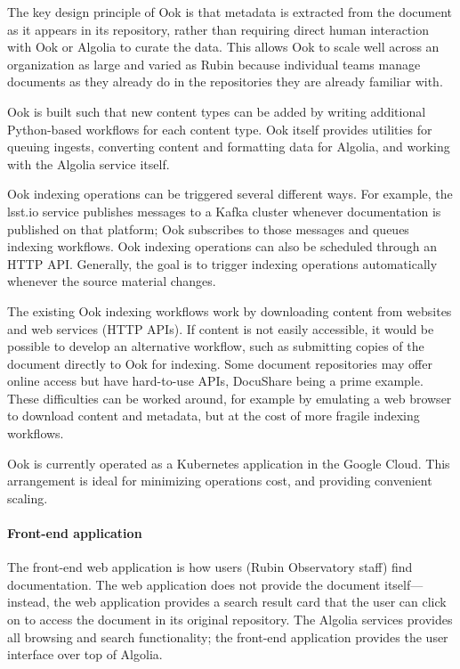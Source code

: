 The key design principle of Ook is that metadata is extracted from the document as it appears in its repository, rather than requiring direct human interaction with Ook or Algolia to curate the data.
This allows Ook to scale well across an organization as large and varied as Rubin because individual teams manage documents as they already do in the repositories they are already familiar with.

Ook is built such that new content types can be added by writing additional Python-based workflows for each content type.
Ook itself provides utilities for queuing ingests, converting content and formatting data for Algolia, and working with the Algolia service itself.

Ook indexing operations can be triggered several different ways.
For example, the lsst.io service publishes messages to a Kafka cluster whenever documentation is published on that platform; Ook subscribes to those messages and queues indexing workflows.
Ook indexing operations can also be scheduled through an HTTP API.
Generally, the goal is to trigger indexing operations automatically whenever the source material changes.

The existing Ook indexing workflows work by downloading content from websites and web services (HTTP APIs).
If content is not easily accessible, it would be possible to develop an alternative workflow, such as submitting copies of the document directly to Ook for indexing.
Some document repositories may offer online access but have hard-to-use APIs, DocuShare being a prime example.
These difficulties can be worked around, for example by emulating a web browser to download content and metadata, but at the cost of more fragile indexing workflows.

Ook is currently operated as a Kubernetes application in the Google Cloud.
This arrangement is ideal for minimizing operations cost, and providing convenient scaling.

\paragraph{Front-end application}

The front-end web application is how users (Rubin Observatory staff) find documentation.
The web application does not provide the document itself—instead, the web application provides a search result card that the user can click on to access the document in its original repository.
The Algolia services provides all browsing and search functionality; the front-end application provides the user interface over top of Algolia.

